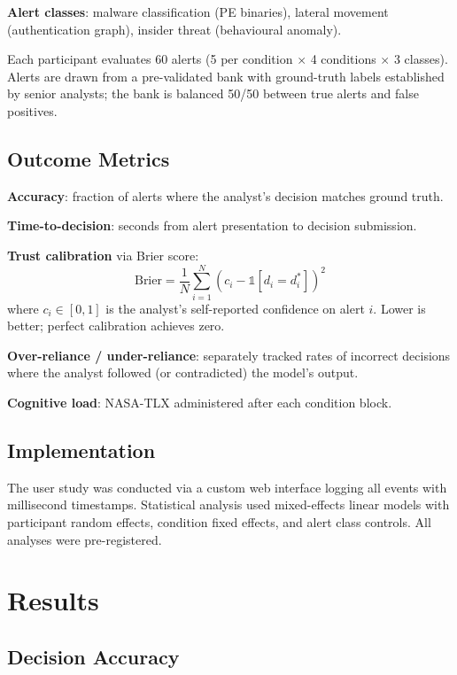 \documentclass[sigconf,nonacm]{acmart}
\begin{document}
\textbf{Alert classes}: malware classification (PE binaries),
lateral movement (authentication graph), insider threat (behavioural
anomaly).

Each participant evaluates 60 alerts (5 per condition $\times$ 4 conditions
$\times$ 3 classes). Alerts are drawn from a pre-validated bank with
ground-truth labels established by senior analysts; the bank is balanced
50/50 between true alerts and false positives.

\subsection{Outcome Metrics}

\textbf{Accuracy}: fraction of alerts where the analyst's decision matches
ground truth.

\textbf{Time-to-decision}: seconds from alert presentation to decision
submission.

\textbf{Trust calibration} via Brier score:
\begin{equation}
  \text{Brier} = \frac{1}{N}\sum_{i=1}^N (c_i - \mathbb{1}[d_i = d^*_i])^2
\end{equation}
where $c_i \in [0,1]$ is the analyst's self-reported confidence on alert
$i$. Lower is better; perfect calibration achieves zero.

\textbf{Over-reliance / under-reliance}: separately tracked rates of
incorrect decisions where the analyst followed (or contradicted) the model's
output.

\textbf{Cognitive load}: NASA-TLX administered after each condition block.

\subsection{Implementation}

The user study was conducted via a custom web interface logging all events
with millisecond timestamps. Statistical analysis used mixed-effects linear
models with participant random effects, condition fixed effects, and alert
class controls. All analyses were pre-registered.

\section{Results}
\label{sec:results}

\subsection{Decision Accuracy}
\end{document}
